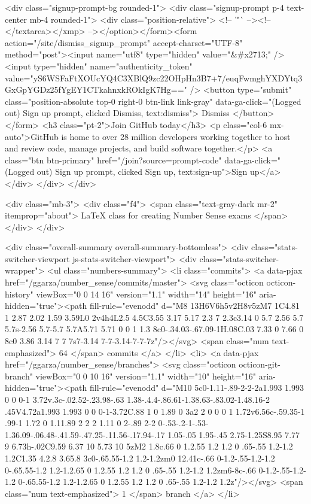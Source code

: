     
      <div class="signup-prompt-bg rounded-1">
      <div class="signup-prompt p-4 text-center mb-4 rounded-1">
        <div class="position-relative">
          <!-- '"` --><!-- </textarea></xmp> --></option></form><form action="/site/dismiss_signup_prompt" accept-charset="UTF-8" method="post"><input name="utf8" type="hidden" value="&#x2713;" /><input type="hidden" name="authenticity_token" value="yS6WSFaFtXOUcYQ4C3XBlQ9zc22OHpHn3B7+7/euqFwmghYXDYtq3GxGpYGDz25fYgEY1CTkahnxkROkIgK7Hg==" />
            <button type="submit" class="position-absolute top-0 right-0 btn-link link-gray" data-ga-click="(Logged out) Sign up prompt, clicked Dismiss, text:dismiss">
              Dismiss
            </button>
</form>          <h3 class="pt-2">Join GitHub today</h3>
          <p class="col-6 mx-auto">GitHub is home to over 28 million developers working together to host and review code, manage projects, and build software together.</p>
          <a class="btn btn-primary" href="/join?source=prompt-code" data-ga-click="(Logged out) Sign up prompt, clicked Sign up, text:sign-up">Sign up</a>
        </div>
      </div>
    </div>


    <div class="mb-3">  <div class="f4">
        <span class="text-gray-dark mr-2" itemprop="about">
          LaTeX class for creating Number Sense exams
        </span>
  </div>
</div>




  <div class="overall-summary overall-summary-bottomless">
    <div class="stats-switcher-viewport js-stats-switcher-viewport">
      <div class="stats-switcher-wrapper">
      <ul class="numbers-summary">
        <li class="commits">
          <a data-pjax href="/ggarza/number_sense/commits/master">
              <svg class="octicon octicon-history" viewBox="0 0 14 16" version="1.1" width="14" height="16" aria-hidden="true"><path fill-rule="evenodd" d="M8 13H6V6h5v2H8v5zM7 1C4.81 1 2.87 2.02 1.59 3.59L0 2v4h4L2.5 4.5C3.55 3.17 5.17 2.3 7 2.3c3.14 0 5.7 2.56 5.7 5.7s-2.56 5.7-5.7 5.7A5.71 5.71 0 0 1 1.3 8c0-.34.03-.67.09-1H.08C.03 7.33 0 7.66 0 8c0 3.86 3.14 7 7 7s7-3.14 7-7-3.14-7-7-7z"/></svg>
              <span class="num text-emphasized">
                64
              </span>
              commits
          </a>
        </li>
        <li>
          <a data-pjax href="/ggarza/number_sense/branches">
            <svg class="octicon octicon-git-branch" viewBox="0 0 10 16" version="1.1" width="10" height="16" aria-hidden="true"><path fill-rule="evenodd" d="M10 5c0-1.11-.89-2-2-2a1.993 1.993 0 0 0-1 3.72v.3c-.02.52-.23.98-.63 1.38-.4.4-.86.61-1.38.63-.83.02-1.48.16-2 .45V4.72a1.993 1.993 0 0 0-1-3.72C.88 1 0 1.89 0 3a2 2 0 0 0 1 1.72v6.56c-.59.35-1 .99-1 1.72 0 1.11.89 2 2 2 1.11 0 2-.89 2-2 0-.53-.2-1-.53-1.36.09-.06.48-.41.59-.47.25-.11.56-.17.94-.17 1.05-.05 1.95-.45 2.75-1.25S8.95 7.77 9 6.73h-.02C9.59 6.37 10 5.73 10 5zM2 1.8c.66 0 1.2.55 1.2 1.2 0 .65-.55 1.2-1.2 1.2C1.35 4.2.8 3.65.8 3c0-.65.55-1.2 1.2-1.2zm0 12.41c-.66 0-1.2-.55-1.2-1.2 0-.65.55-1.2 1.2-1.2.65 0 1.2.55 1.2 1.2 0 .65-.55 1.2-1.2 1.2zm6-8c-.66 0-1.2-.55-1.2-1.2 0-.65.55-1.2 1.2-1.2.65 0 1.2.55 1.2 1.2 0 .65-.55 1.2-1.2 1.2z"/></svg>
            <span class="num text-emphasized">
              1
            </span>
            branch
          </a>
        </li>

